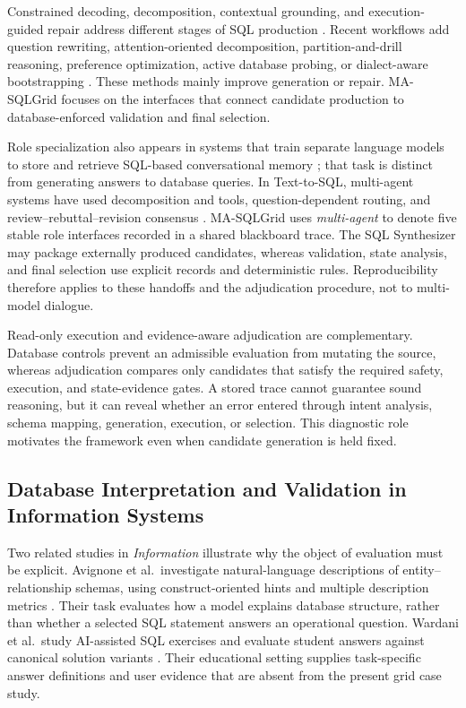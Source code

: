 \documentclass[information,article,submit,moreauthors]{Definitions/mdpi}
\newcommand{\masql}{MA-SQLGrid}
\begin{document}
Constrained decoding, decomposition, contextual grounding, and execution-guided repair address different stages of SQL production \cite{scholak2021picard,nan2023enhancing,sun2023sqlprompt,pourreza2023dinsql,talaei2024chess}. Recent workflows add question rewriting, attention-oriented decomposition, partition-and-drill reasoning, preference optimization, active database probing, or dialect-aware bootstrapping \cite{mao2024dartsql,xie2024deasql,luo2024ptdsql,zhai2025executionfeedback,xie2026sdesql,zhang2025exesql}. These methods mainly improve generation or repair. \masql{} focuses on the interfaces that connect candidate production to database-enforced validation and final selection.

Role specialization also appears in systems that train separate language models to store and retrieve SQL-based conversational memory \cite{lee2025team}; that task is distinct from generating answers to database queries. In Text-to-SQL, multi-agent systems have used decomposition and tools, question-dependent routing, and review--rebuttal--revision consensus \cite{wang2025macsql,shao2025qcmasql,xia2025r3}. \masql{} uses \emph{multi-agent} to denote five stable role interfaces recorded in a shared blackboard trace. The SQL Synthesizer may package externally produced candidates, whereas validation, state analysis, and final selection use explicit records and deterministic rules. Reproducibility therefore applies to these handoffs and the adjudication procedure, not to multi-model dialogue.

Read-only execution and evidence-aware adjudication are complementary. Database controls prevent an admissible evaluation from mutating the source, whereas adjudication compares only candidates that satisfy the required safety, execution, and state-evidence gates. A stored trace cannot guarantee sound reasoning, but it can reveal whether an error entered through intent analysis, schema mapping, generation, execution, or selection. This diagnostic role motivates the framework even when candidate generation is held fixed.

\subsection{Database Interpretation and Validation in Information Systems}

Two related studies in \emph{Information} illustrate why the object of evaluation must be explicit. Avignone et al.\ investigate natural-language descriptions of entity--relationship schemas, using construct-oriented hints and multiple description metrics \cite{avignone2025exploring}. Their task evaluates how a model explains database structure, rather than whether a selected SQL statement answers an operational question. Wardani et al.\ study AI-assisted SQL exercises and evaluate student answers against canonical solution variants \cite{wardani2026sql}. Their educational setting supplies task-specific answer definitions and user evidence that are absent from the present grid case study.
\end{document}
